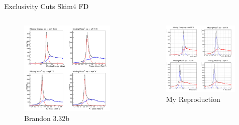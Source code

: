 \documentclass[aspectratio=169]{beamer}
\begin{document}
\begin{frame}{Exclusivity Cuts \hfill Skim4 FD}
\vspace*{-0.6cm}
    \begin{columns}
    \begin{figure}
        \centering
        \includegraphics[width=0.94\textwidth]{brandon_figs/32b.png}
        \caption{Brandon 3.32b}
    \end{figure}
    \begin{figure}
        \centering
        \includegraphics[width=0.97\textwidth]{pdfs/32b.png}
        \caption{My Reproduction}
    \end{figure}
    \end{columns}
\end{frame}
\end{document}
